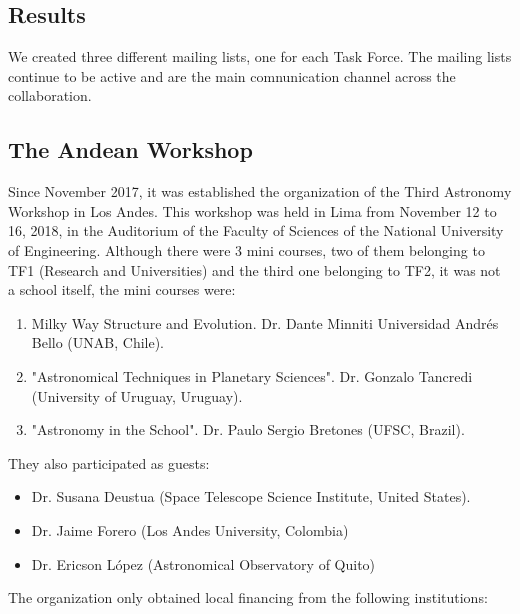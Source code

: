 \subsection{Results}
We created three different mailing lists, one for each Task Force. The mailing lists continue to be active 
and are the main comnunication channel across the collaboration.



\subsection{The Andean Workshop}
Since November 2017, it was established the organization of the Third Astronomy Workshop in Los Andes. This workshop was held in Lima from November 12 to 16, 2018, in the Auditorium of the Faculty of Sciences of the National University of Engineering. Although there were 3 mini courses, two of them belonging to TF1 (Research and Universities) and the third one belonging to TF2, it was not a school itself, the mini courses were:

\begin{enumerate}
    \item  Milky Way Structure and Evolution. Dr. Dante Minniti Universidad Andrés Bello (UNAB, Chile).
    \item "Astronomical Techniques in Planetary Sciences". Dr. Gonzalo Tancredi (University of Uruguay, Uruguay).
    \item "Astronomy in the School". Dr. Paulo Sergio Bretones (UFSC, Brazil).
\end{enumerate}
They also participated as guests:
\begin{itemize}
    \item Dr. Susana Deustua (Space Telescope Science Institute, United States).
    \item Dr. Jaime Forero (Los Andes University, Colombia)
    \item Dr. Ericson López (Astronomical Observatory of Quito)
\end{itemize}


 The organization only obtained local financing from the following institutions:
 
